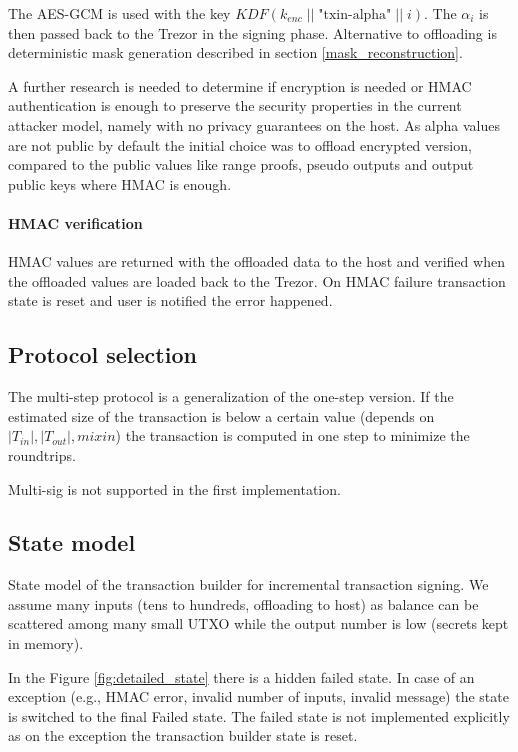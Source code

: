 \documentclass[]{article}
\begin{document}
The AES-GCM is used with the key $\textit{KDF}\left(k_{enc} \; || \; \text{"txin-alpha"} \; || \; i\right)$. The $\alpha_i$ is then passed back to the Trezor in the signing phase. Alternative to offloading is deterministic mask generation described in section \ref{mask_reconstruction}.

A further research is needed to determine if encryption is needed or HMAC authentication is enough to preserve the security properties in the current attacker model, namely with no privacy guarantees on the host. As alpha values are not public by default the initial choice was to offload encrypted version, compared to the public values like range proofs, pseudo outputs and output public keys where HMAC is enough.

\paragraph{HMAC verification}
HMAC values are returned with the offloaded data to the host and verified when the offloaded values are loaded back to the Trezor. 
On HMAC failure transaction state is reset and user is notified the error happened.

\subsection{Protocol selection}
The multi-step protocol is a generalization of the one-step version.
If the estimated size of the transaction is below a certain value (depends on $|T_{in}|, |T_{out}|, mixin$) the transaction is computed in one step to minimize the roundtrips. 

Multi-sig is not supported in the first implementation.

\subsection{State model}

State model of the transaction builder for incremental transaction signing. We assume many inputs (tens to hundreds, offloading to host) as balance can be scattered among many small UTXO while the output number is low (secrets kept in memory).

In the Figure \ref{fig:detailed_state} there is a hidden failed state. In case of an exception (e.g., HMAC error, invalid number of inputs, invalid message) the state is switched to the final Failed state. The failed state is not implemented explicitly as on the exception the transaction builder state is reset.
\end{document}
